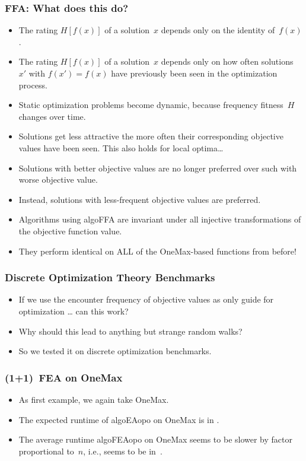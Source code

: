 \documentclass[aspectratio=169,mathserif,notheorems]{beamer}%
\begin{document}
\begin{frame}%
\frametitle{FFA: What does this do?}%
\begin{itemize}%
\item The rating $H[f(x)]$ of a solution~$x$ depends only on the identity of~$f(x)$.
\item<2-> The rating $H[f(x)]$ of a solution~$x$ depends only on how often solutions~$x'$ with $f(x')=f(x)$ have previously been seen in the optimization process.%
\item<3-> Static optimization problems become dynamic, because frequency fitness~$H$ changes over time.%
\item<4-> Solutions get less attractive the more often their corresponding objective values have been seen. This also holds for local optima\dots%
\item<5-> Solutions with better objective values are no longer preferred over such with worse objective value.%
\item<6-> Instead, solutions with less-frequent objective values are preferred.%
\item<7-> \alert{Algorithms using \gls{algoFFA} are invariant under all injective transformations of the objective function value.}%
\item<8-> \alert{They perform identical on ALL of the OneMax-based functions from before!}%
\end{itemize}%
\end{frame}%
%
\begin{frame}[t]%
\frametitle{Discrete Optimization Theory Benchmarks}%
\begin{itemize}%
\item If we use the encounter frequency of objective values as \alert{only} guide for optimization {\dots} can this work?%
\item<2-> Why should this lead to anything but strange random walks?%
\item<3-> So we tested it on discrete optimization benchmarks.%
\end{itemize}%
%
%
\end{frame}%
%
\begin{frame}%
\frametitle{(1+1)~FEA on OneMax}%
\parbox{0.37\paperwidth}{%
\begin{itemize}%
\item As first example, we again take OneMax\cite{M1992HGARWMAH}.%
\item<2-> The expected runtime of \gls{algoEAopo} on OneMax is in .\cite{DDE2015FBBCTDNGA,M1992HGARWMAH}%
\item<3-> The average runtime \gls{algoFEAopo} on OneMax seems to be slower by factor proportional to~$n$, i.e., seems to be in~.%
\end{itemize}%
}%
%
%
%
\end{frame}%
\end{document}
